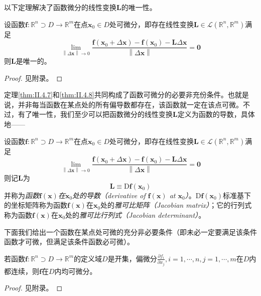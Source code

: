 \documentclass[../main.tex]{subfiles}
\begin{document}
以下定理解决了函数微分的线性变换$\mathbf{L}$的唯一性。

\begin{theorem}\label{thm:II.4.8}
    设函数$\mathbf{f}:\mathbb{R}^n\supset D\rightarrow\mathbb{R}^m$在点$\mathbf{x}_0\in D$处可微分，即存在线性变换$\mathbf{L}\in\mathcal{L}\left(\mathbb{R}^n,\mathbb{R}^m\right)$满足
    \[
        \lim_{\left\|\Delta\mathbf{x}\right\|\to 0}\frac{\mathbf{f}\left(\mathbf{x}_0+\Delta \mathbf{x}\right)-\mathbf{f}\left(\mathbf{x}_0\right)-\mathbf{L}\Delta\mathbf{x}}{\left\|\Delta\mathbf{x}\right\|}=\mathbf{0}
    \]
    则$\mathbf{L}$是唯一的。
\end{theorem}
\begin{proof}
    见附录。
\end{proof}

定理\ref{thm:II.4.7}和\ref{thm:II.4.8}共同构成了函数可微分的必要非充份条件。也就是说，并非每当函数在某点处的所有偏导数都存在，该函数就一定在该点可微\cite[“例2”,p.~21]{华工高数2009下}。不过，有了唯一性，我们至少可以把函数微分的线性变换$\mathbf{L}$定义为函数的导数，具体地——

\begin{definition}[向量函数的导数]\label{def:II.4.14}
    设函数$\mathbf{f}:\mathbb{R}^n\supset D\rightarrow\mathbb{R}^m$在点$\mathbf{x}_0\in D$处可微分，即存在线性变换$\mathbf{L}\in\mathcal{L}\left(\mathbb{R}^n,\mathbb{R}^m\right)$满足
    \[
        \lim_{\left\|\Delta\mathbf{x}\right\|\to 0}\frac{\mathbf{f}\left(\mathbf{x}_0+\Delta \mathbf{x}\right)-\mathbf{f}\left(\mathbf{x}_0\right)-\mathbf{L}\Delta\mathbf{x}}{\left\|\Delta\mathbf{x}\right\|}=\mathbf{0}
    \]
    则记$\mathbf{L}$为
    \[\mathbf{L}\equiv \mathrm{D}\mathbf{f}\left(\mathbf{x}_0\right)\]
    并称为\emph{函数$\mathbf{f}\left(\mathbf{x}\right)$在$\mathbf{x}_0$处的导数（derivative of $\mathbf{f}\left(\mathbf{x}\right)$ at $\mathbf{x}_0$）}。$\mathrm{D}\mathbf{f}\left(\mathbf{x}_0\right)$标准基下的坐标矩阵称为函数$\mathbf{f}\left(\mathbf{x}\right)$在$\mathbf{x}_0$处的\emph{雅可比矩阵（Jacobian matrix）}；它的行列式称为函数$\mathbf{f}\left(\mathbf{x}\right)$在$\mathbf{x}_0$处的\emph{雅可比行列式（Jacobian determinant）}。
\end{definition}

下面我们给出一个函数在某点处可微的充分非必要条件（即未必一定要满足该条件函数才可微，但满足该条件函数必可微）\cite[“例3”,p.~23]{华工高数2009下}。

\begin{theorem}\label{thm:II.4.9}
    若函数$\mathbf{f}:\mathbb{R}^n\supset D\rightarrow\mathbb{R}^m$的定义域$D$是开集，偏微分$\frac{\partial f_i}{\partial x_j},i=1,\cdots,n,j=1,\cdots,m$在$D$内都连续，则$\mathbf{f}$在$D$内均可微分。
\end{theorem}
\begin{proof}
    见附录。
\end{proof}
\end{document}
